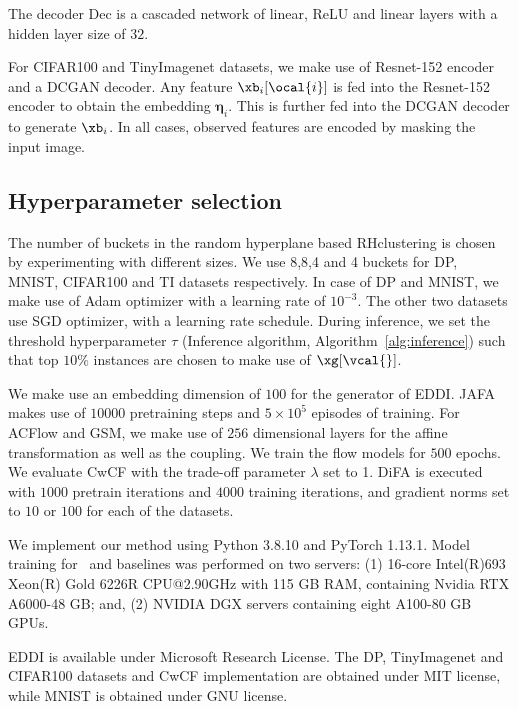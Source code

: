 \documentclass[letterpaper]{article}
\begin{document}
The decoder $\text{Dec}$ is a cascaded network of linear, ReLU and linear layers with a hidden layer size of $32$.

 For CIFAR100 and TinyImagenet datasets, we make use of Resnet-152 encoder and a DCGAN decoder. Any feature $\xb_i[\ocal{i}]$ is fed into the Resnet-152 encoder to obtain the embedding $\bm{\eta}_i$. This is further fed into the DCGAN decoder to generate $\xb_i$. In all cases, observed features are encoded by masking the input image.


\subsection{Hyperparameter selection}
The number of buckets in the random hyperplane based RHclustering is chosen by experimenting with different sizes. We use 8,8,4 and 4 buckets for DP, MNIST, CIFAR100 and TI datasets respectively.
%
In case of DP and MNIST, we make use of Adam optimizer with a learning rate of $10^{-3}$. The other two datasets use SGD optimizer, with a learning rate schedule. During inference, we set the threshold hyperparameter $\tau$ (Inference algorithm, Algorithm~\ref{alg:inference}) such that
top $10\%$ instances are chosen to make use of $\xg[\vcal{}]$.

We make use an embedding dimension of $100$ for the generator of EDDI. JAFA makes use of $10000$ pretraining steps and $5\times 10^{5}$ episodes of training. For ACFlow and GSM, we make use of $256$ dimensional layers for the affine transformation as well as the coupling. We train the flow models for $500$ epochs. We evaluate CwCF with the trade-off parameter $\lambda$ set to 1. DiFA is executed with $1000$ pretrain iterations and $4000$ training iterations, and gradient norms set to $10$ or $100$ for each of the datasets.

We implement our method using Python 3.8.10 and PyTorch 1.13.1. Model training for \our\ and baselines was performed on two servers: (1) 16-core Intel(R)693
Xeon(R) Gold 6226R CPU@2.90GHz with 115 GB RAM,  containing Nvidia RTX A6000-48 GB; and,
(2) NVIDIA DGX servers containing eight A100-80 GB GPUs.

EDDI is available under Microsoft Research License. The DP, TinyImagenet and CIFAR100 datasets and CwCF implementation are obtained under MIT license, while MNIST is obtained under GNU license.
\end{document}
